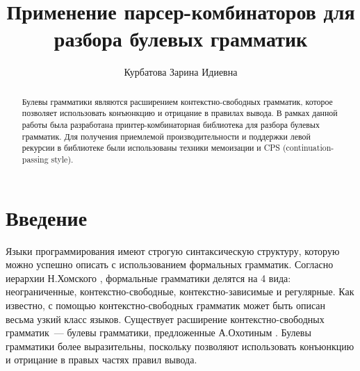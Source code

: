 \title{Применение парсер-комбинаторов для разбора булевых грамматик}


\author{Курбатова Зарина Идиевна}



\maketitle

\begin{abstract}
  Булевы грамматики являются расширением контекстно-свободных грамматик, которое позволяет
  использовать конъюнкцию и отрицание в правилах вывода. В рамках данной работы была
  разработана принтер-комбинаторная библиотека для разбора булевых грамматик. Для
  получения приемлемой производительности и поддержки левой рекурсии в библиотеке были
  использованы техники мемоизации и CPS (continuation-passing style).
\end{abstract}

\section*{Введение} 
Языки программирования имеют строгую синтаксическую структуру, которую можно успешно описать с использованием формальных грамматик. Согласно иерархии Н.Хомского \cite{chomsky1956three}, формальные грамматики делятся на 4 вида:  неограниченные, контекстно-свободные, контекстно-зависимые и регулярные. Как известно, с помощью контекстно-свободных грамматик может быть описан весьма узкий класс языков. Существует расширение контекстно-свободных грамматик~--- булевы грамматики, предложенные А.Охотиным \cite{okhotin2004boolean}. Булевы грамматики более выразительны, поскольку позволяют использовать конъюнкцию и отрицание в правых частях правил вывода.


